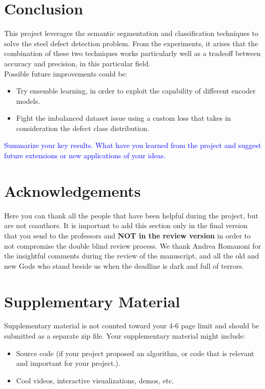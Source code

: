 \documentclass[10pt,twocolumn,letterpaper]{article}
\begin{document}
\section{Conclusion} 
This project leverages the semantic segmentation and classification techniques to solve the steel defect detection problem. From the experiments, it arises that the combination of these two techniques works particularly well as a tradeoff between accuracy and precision, in this particular field.\\
Possible future improvements could be:
\begin{itemize}
   \item Try ensemble learning, in order to exploit the capability of different encoder models.
   \item Fight the imbalanced dataset issue using a custom loss that takes in consideration the defect class distribution.
\end{itemize}

\textcolor{blue}{
Summarize your key results. What have you learned from the project and suggest future extensions or new applications of your ideas.}





\section*{Acknowledgements}
Here you can thank all the people that have been helpful during the project, but are not coauthors. It is important to add this section only in the final version that you send to the professors and \textbf{NOT in the review version} in order to not compromise the double blind review process. We thank Andrea Romanoni for the insightful comments during the review of the manuscript, and all the old and new Gods who stand beside us when the deadline is dark and full of terrors. 

\appendix
\section{Supplementary Material} 
Supplementary material is not counted toward your 4-6 page limit and should be submitted as a separate zip file. Your supplementary material might include:
\begin{itemize}
    \item Source code (if your project proposed an algorithm, or code that is relevant and important for your project.).
    \item Cool videos, interactive visualizations, demos, etc.
\end{itemize}
\end{document}
